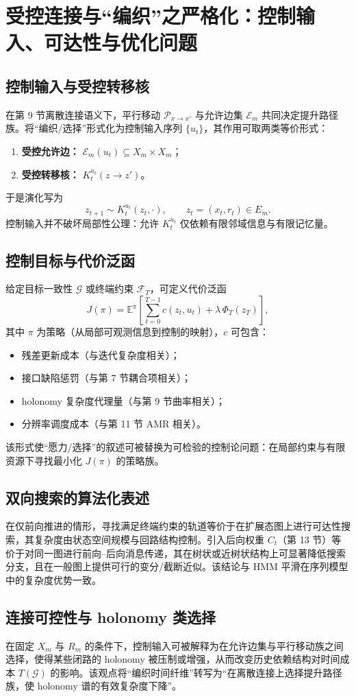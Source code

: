 \section{受控连接与“编织”之严格化：控制输入、可达性与优化问题}

\subsection{控制输入与受控转移核}

在第 9 节离散连接语义下，平行移动 $\mathcal P_{x\to x'}$ 与允许边集 $\mathcal E_m$ 共同决定提升路径族。将“编织/选择”形式化为控制输入序列 $\{u_t\}$，其作用可取两类等价形式：
\begin{enumerate}
  \item \textbf{受控允许边：} $\mathcal E_m(u_t)\subseteq X_m\times X_m$；
  \item \textbf{受控转移核：} $K_t^{u_t}(z\to z')$。
\end{enumerate}
于是演化写为
$$
z_{t+1}\sim K_t^{u_t}(z_t,\cdot),\qquad z_t=(x_t,r_t)\in E_m.
$$
控制输入并不破坏局部性公理：允许 $K_t^{u_t}$ 仅依赖有限邻域信息与有限记忆量。

\subsection{控制目标与代价泛函}

给定目标一致性 $\mathcal G$ 或终端约束 $\mathcal F_T$，可定义代价泛函
$$
J(\pi)=\mathbb E^{\pi}\left[\sum_{t=0}^{T-1} c(z_t,u_t)+\lambda\,\Phi_T(z_T)\right],
$$
其中 $\pi$ 为策略（从局部可观测信息到控制的映射），$c$ 可包含：
\begin{itemize}
  \item 残差更新成本（与迭代复杂度相关）；
  \item 接口缺陷惩罚（与第 7 节耦合项相关）；
  \item holonomy 复杂度代理量（与第 9 节曲率相关）；
  \item 分辨率调度成本（与第 11 节 AMR 相关）。
\end{itemize}
该形式使“愿力/选择”的叙述可被替换为可检验的控制论问题：在局部约束与有限资源下寻找最小化 $J(\pi)$ 的策略族。

\subsection{双向搜索的算法化表述}

在仅前向推进的情形，寻找满足终端约束的轨道等价于在扩展态图上进行可达性搜索，其复杂度由状态空间规模与回路结构控制。引入后向权重 $C_t$（第 13 节）等价于对同一图进行前向--后向消息传递，其在树状或近树状结构上可显著降低搜索分支，且在一般图上提供可行的变分/截断近似。该结论与 HMM 平滑在序列模型中的复杂度优势一致。\cite{rabiner_hmm_tutorial}

\subsection{连接可控性与 holonomy 类选择}

在固定 $X_m$ 与 $R_m$ 的条件下，控制输入可被解释为在允许边集与平行移动族之间选择，使得某些闭路的 holonomy 被压制或增强，从而改变历史依赖结构对时间成本 $T(\mathcal G)$ 的影响。该观点将“编织时间纤维”转写为“在离散连接上选择提升路径族，使 holonomy 谱的有效复杂度下降”。
